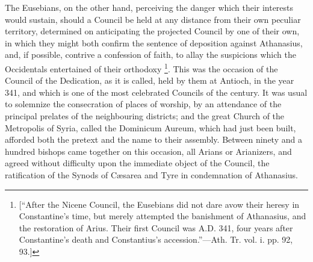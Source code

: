 The Eusebians, on the other hand, perceiving the danger which their
interests would sustain, should a Council be held at any distance from
their own peculiar territory, determined on anticipating the projected
Council by one of their own, in which they might both confirm the
sentence of deposition against Athanasius, and, if possible, contrive
a confession of faith, to allay the suspicions which the Occidentals
entertained of their orthodoxy \footnote{[``After the Nicene Council, the
Eusebians did not dare avow their heresy in Constantine's time, but
merely attempted the banishment of Athanasius, and the restoration of
Arius. Their first Council was A.D. 341, four
years after Constantine's death and Constantius's accession.''—Ath.
Tr. vol. i. pp. 92, 93.]}.
This was the occasion of the Council of the Dedication, as it is
called, held by them at Antioch, in the year 341, and which is one of
the most celebrated Councils of the century. It was usual to solemnize
the consecration of places of worship, by an attendance of the
principal prelates of the neighbouring districts; and the great Church
of the Metropolis of Syria, called the Dominicum Aureum, which had
just been built, afforded both the pretext and the name to their
assembly. Between ninety and a hundred bishops came together on this
occasion, all Arians or Arianizers, and agreed without difficulty upon
the immediate object of the Council, the ratification of the Synods of
Cæsarea and Tyre in condemnation of Athanasius.

